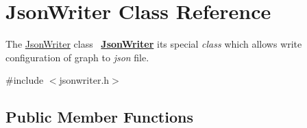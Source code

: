 \hypertarget{class_json_writer}{}\section{Json\+Writer Class Reference}
\label{class_json_writer}


The \mbox{\hyperlink{class_json_writer}{Json\+Writer}} class~\newline
{\bfseries{\mbox{\hyperlink{class_json_writer}{Json\+Writer}}}} it\textquotesingle{}s special {\itshape class} which allows write configuration of graph to {\itshape json} file.  




{\ttfamily \#include $<$jsonwriter.\+h$>$}

\subsection*{Public Member Functions}
